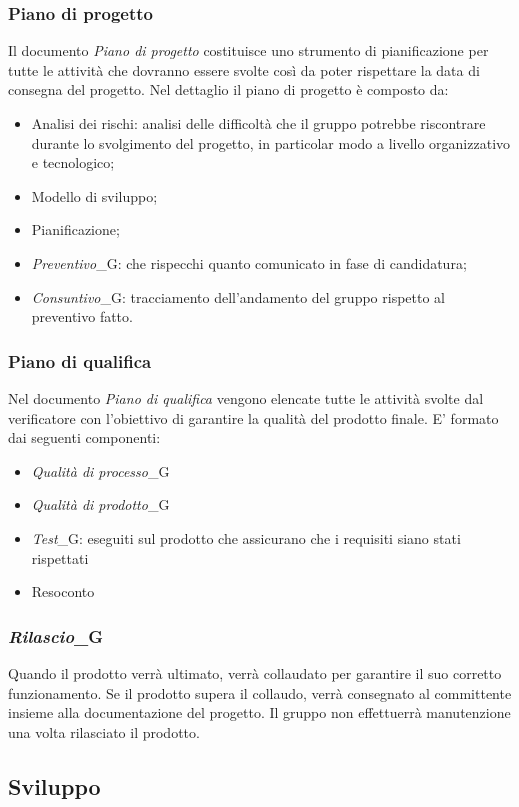 \subsubsection{Piano di progetto}
Il documento \textit{Piano di progetto} costituisce uno strumento di pianificazione per tutte le attività che dovranno essere svolte così da poter rispettare la data di consegna del progetto.
Nel dettaglio il piano di progetto è composto da:
\begin{itemize}
    \item Analisi dei rischi: analisi delle difficoltà che il gruppo potrebbe riscontrare durante lo svolgimento del progetto, in particolar modo a livello organizzativo e tecnologico;
    \item Modello di sviluppo;
    \item Pianificazione;
    \item \textit{Preventivo}_G: che rispecchi quanto comunicato in fase di candidatura;
    \item \textit{Consuntivo}_G: tracciamento dell'andamento del gruppo rispetto al preventivo fatto.
\end{itemize}
\subsubsection{Piano di qualifica}
Nel documento \textit{Piano di qualifica} vengono elencate tutte le attività svolte dal verificatore con l'obiettivo di garantire la qualità del prodotto finale.
E' formato dai seguenti componenti:
\begin{itemize}
    \item \textit{Qualità di processo}_G
    \item \textit{Qualità di prodotto}_G
    \item \textit{Test}_G: eseguiti sul prodotto che assicurano che i requisiti siano stati rispettati
    \item Resoconto
\end{itemize}
\subsubsection{\textit{Rilascio}_G}
Quando il prodotto verrà ultimato, verrà collaudato per garantire il suo corretto funzionamento. Se il prodotto supera il collaudo, verrà consegnato al committente insieme alla documentazione del progetto. 
Il gruppo non effettuerrà manutenzione una volta rilasciato il prodotto.

\subsection{Sviluppo}
